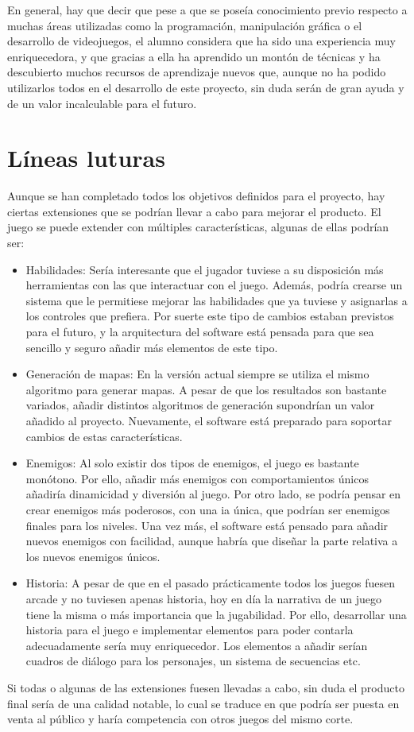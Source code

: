 	En general, hay que decir que pese a que se poseía conocimiento previo respecto a muchas áreas utilizadas como la programación, manipulación gráfica o el desarrollo de videojuegos, el alumno considera que ha sido una experiencia muy enriquecedora, y que gracias a ella ha aprendido un montón de técnicas y ha descubierto muchos recursos de aprendizaje nuevos que, aunque no ha podido utilizarlos todos en el desarrollo de este proyecto, sin duda serán de gran ayuda y de un valor incalculable para el futuro.

\section{Líneas luturas}

	Aunque se han completado todos los objetivos definidos para el proyecto, hay ciertas extensiones que se podrían llevar a cabo para mejorar el producto. El juego se puede extender con múltiples características, algunas de ellas podrían ser:

	\begin{itemize}

		\item Habilidades: Sería interesante que el jugador tuviese a su disposición más herramientas con las que interactuar con el juego. Además, podría crearse un sistema que le permitiese mejorar las habilidades que ya tuviese y asignarlas a los controles que prefiera. Por suerte este tipo de cambios estaban previstos para el futuro, y la arquitectura del software está pensada para que sea sencillo y seguro añadir más elementos de este tipo.

		\item Generación de mapas: En la versión actual siempre se utiliza el mismo algoritmo para generar mapas. A pesar de que los resultados son bastante variados, añadir distintos algoritmos de generación supondrían un valor añadido al proyecto. Nuevamente, el software está preparado para soportar cambios de estas características.

		\item Enemigos: Al solo existir dos tipos de enemigos, el juego es bastante monótono. Por ello, añadir más enemigos con comportamientos únicos añadiría dinamicidad y diversión al juego. Por otro lado, se podría pensar en crear enemigos más poderosos, con una \acrshort{ia} única, que podrían ser enemigos finales para los niveles. Una vez más, el software está pensado para añadir nuevos enemigos con facilidad, aunque habría que diseñar la parte relativa a los nuevos enemigos únicos.

		\item Historia: A pesar de que en el pasado prácticamente todos los juegos fuesen arcade y no tuviesen apenas historia, hoy en día la narrativa de un juego tiene la misma o más importancia que la jugabilidad. Por ello, desarrollar una historia para el juego e implementar elementos para poder contarla adecuadamente sería muy enriquecedor. Los elementos a añadir serían cuadros de diálogo para los personajes, un sistema de secuencias etc.

	\end{itemize}

	Si todas o algunas de las extensiones fuesen llevadas a cabo, sin duda el producto final sería de una calidad notable, lo cual se traduce en que podría ser puesta en venta al público y haría competencia con otros juegos del mismo corte.
	